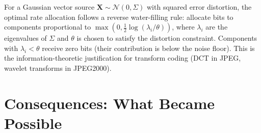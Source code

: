 \begin{example}
For a Gaussian vector source $\mathbf{X} \sim \mathcal{N}(0,\Sigma)$ with squared error distortion, the optimal rate allocation follows a reverse water-filling rule: allocate bits to components proportional to $\max(0, \frac{1}{2}\log(\lambda_i/\theta))$, where $\lambda_i$ are the eigenvalues of $\Sigma$ and $\theta$ is chosen to satisfy the distortion constraint. Components with $\lambda_i < \theta$ receive zero bits (their contribution is below the noise floor). This is the information-theoretic justification for transform coding (DCT in JPEG, wavelet transforms in JPEG2000).
\end{example}

\section{Consequences: What Became Possible}
\label{sec:information:consequences}

